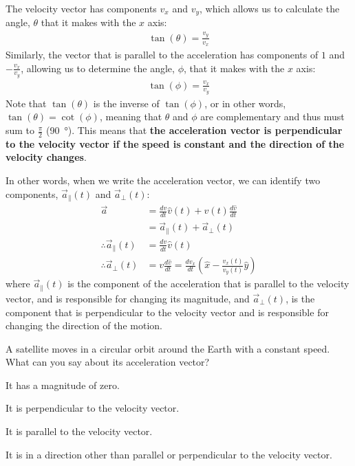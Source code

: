 The velocity vector has components $v_x$ and $v_y$, which allows us to calculate the angle, $\theta$ that it makes with the $x$ axis:
\begin{align*}
\tan(\theta)=\frac{v_y}{v_x}
\end{align*}
Similarly, the vector that is parallel to the acceleration has components of $1$ and $-\frac{v_x}{v_y}$, allowing us to determine the angle, $\phi$, that it makes with the $x$ axis:
\begin{align*}
\tan(\phi)=\frac{v_x}{v_y}
\end{align*}
Note that $\tan(\theta)$ is the inverse of $\tan(\phi)$, or in other words, $\tan(\theta)=\cot(\phi)$, meaning that $\theta$ and $\phi$ are complementary and thus must sum to $\frac{\pi}{2}$ (\SI{90}{\degree}). This means that \textbf{the acceleration vector is perpendicular to the velocity vector if the speed is constant and the direction of the velocity changes}. 

In other words, when we write the acceleration vector, we can identify two components, $\vec a_{\parallel}(t)$ and $\vec a_{\perp}(t)$:
\begin{align*}
\vec a&=\frac{dv}{dt}\hat v(t)+v(t)\frac{d\hat v}{dt}\\
&=\vec a_{\parallel}(t) + \vec a_{\perp}(t)\\
\therefore \vec a_{\parallel}(t)&=\frac{dv}{dt}\hat v(t)\\
\therefore \vec a_{\perp}(t)&=v\frac{d\hat v}{dt}=\frac{dv_x}{dt} \left(\hat x - \frac{v_x(t)}{v_y(t)}\hat y\right)
\end{align*}
where $\vec a_{\parallel}(t)$ is the component of the acceleration that is parallel to the velocity vector, and is responsible for changing its magnitude, and $\vec a_{\perp}(t)$, is the component that is perpendicular to the velocity vector and is responsible for changing the direction of the motion.

\begin{checkpoint}{\begin{MCquestion}{A satellite moves in a circular orbit around the Earth with a constant speed. What can you say about its acceleration vector?}
\item It has a magnitude of zero.
\item It is perpendicular to the velocity vector.
\item It is parallel to the velocity vector.
\item It is in a direction other than parallel or perpendicular to the velocity vector.
\end{MCquestion}}
\end{checkpoint}

